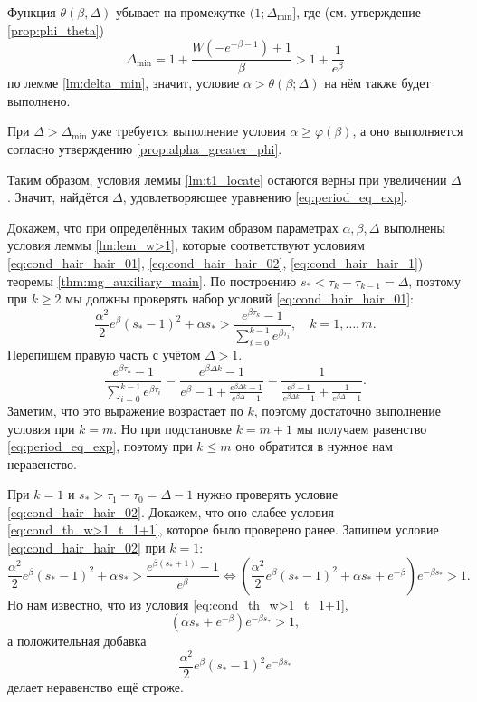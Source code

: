 Функция $\theta(\beta, \Delta)$ убывает на промежутке $(1; \Delta_{\text{min}}]$, где (см. утверждение \ref{prop:phi_theta})
%
\[\Delta_{\text{min}} = 1 + \dfrac{W(-e^{-\beta - 1}) + 1}{\beta} > 1 + \dfrac{1}{e^{\beta}}\]
%
по лемме \ref{lm:delta_min}, значит, условие $\alpha > \theta(\beta; \Delta)$ на нём также будет выполнено. %

При $\Delta > \Delta_{\text{min}}$ уже требуется выполнение условия $\alpha \geqslant \varphi(\beta)$, а оно выполняется согласно утверждению \ref{prop:alpha_greater_phi}.

Таким образом, условия леммы 
\ref{lm:t1_locate} остаются верны при увеличении $\Delta$. Значит, найдётся $\Delta$, удовлетворяющее уравнению \eqref{eq:period_eq_exp}.

Докажем, что при определённых таким образом параметрах $\alpha, \beta, \Delta$ выполнены условия леммы \ref{lm:lem_w>1}, которые соответствуют условиям \eqref{eq:cond_hair_hair_01}, \eqref{eq:cond_hair_hair_02}, \eqref{eq:cond_hair_hair_1}) теоремы \ref{thm:mg_auxiliary_main}. По построению $s_* < \tau_k - \tau_{k - 1} = \Delta$, поэтому при $k \geqslant 2$ мы должны проверять набор условий \eqref{eq:cond_hair_hair_01}:
\[
\frac{\alpha^2}{2}e^\beta(s_*-1)^2+\alpha s_* > \frac{e^{\beta \tau_k}-1}{\sum_{i=0}^{k-1}e^{\beta \tau_i}},\quad k=1,\ldots,m.
\]
%
Перепишем правую часть с учётом $\Delta > 1$.
\[
\frac{e^{\beta \tau_k}-1}{\sum_{i=0}^{k-1}e^{\beta \tau_i}} = \frac{e^{\beta\Delta k } - 1}{e^{\beta} - 1 + \frac{e^{\beta\Delta k} - 1}{e^{\beta\Delta} - 1}} = \frac{1}{\frac{e^{\beta} - 1}{e^{\beta\Delta k} - 1} + \frac{1}{e^{\beta\Delta} - 1}}.
\]
%
Заметим, что это выражение возрастает по $k$, поэтому достаточно выполнение условия при $k = m$. Но при подстановке $k = m + 1$ мы получаем равенство \eqref{eq:period_eq_exp}, поэтому при $k \leqslant m$ оно обратится в нужное нам неравенство.

При $k = 1$ и $s_* > \tau_1 - \tau_0 = \Delta - 1$ нужно проверять условие \eqref{eq:cond_hair_hair_02}. Докажем, что оно слабее условия \eqref{eq:cond_th_w>1_t_1+1}, которое было проверено ранее. Запишем условие \eqref{eq:cond_hair_hair_02} при $k=1$:
\[
\frac{\alpha^2}{2} e^{\beta}(s_* - 1)^2 + \alpha s_* > \frac{e^{\beta (s_* + 1)} - 1}{e^{\beta}} \Leftrightarrow \left(\frac{\alpha^2}{2} e^{\beta}(s_* - 1)^2 + \alpha s_* + e^{-\beta}\right)e^{-\beta s_*} > 1.
\]
%
Но нам известно, что из условия \eqref{eq:cond_th_w>1_t_1+1},
\[
\left(\alpha s_* + e^{-\beta}\right)e^{-\beta s_*} > 1,
\]
%
а положительная добавка
\[\dfrac{\alpha^2}{2} e^{\beta}(s_* - 1)^2 e^{-\beta s_*}\]
делает неравенство ещё строже.

